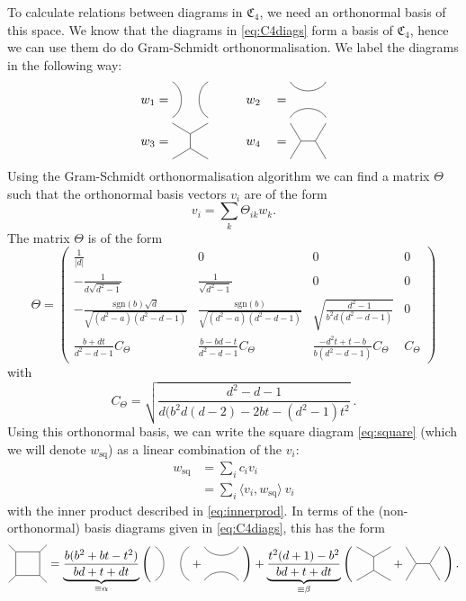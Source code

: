 To calculate relations between diagrams in $\mathfrak{C}_4$, we need an orthonormal basis of this space. We know that the diagrams in \cref{eq:C4diags} form a basis of $\mathfrak{C}_4$, hence we can use them do do Gram-Schmidt orthonormalisation. We label the diagrams in the following way:
	\begin{alignat}{2}
		w_1&=\Cfourone\hspace{30pt} w_2&&=\Cfourtwo\\
		w_3&=\Cfourthree\hspace{30pt} w_4&&=\Cfourfour
	\end{alignat}
Using the Gram-Schmidt orthonormalisation algorithm we can find a matrix $\Theta$ such that the orthonormal basis vectors $v_i$ are of the form
	\begin{equation}
		v_i=\sum_k\Theta_{ik} w_k.
	\end{equation}
The matrix $\Theta$ is of the form
	\begin{equation}
		\Theta=
		\begin{pmatrix}
		\frac{1}{|d|} & 0 & 0 & 0 \\
		-\frac{1}{d\sqrt{d^2-1}} & \frac{1}{\sqrt{d^2-1}} & 0 & 0 \\
		-\frac{\mathrm{sgn}(b) \sqrt{d}}{\sqrt{(d^2-a)(d^2-d-1)}} & \frac{\mathrm{sgn}(b)}{\sqrt{(d^2-a)(d^2-d-1)}} & \sqrt{\frac{d^2-1}{b^2d(d^2-d-1)}} & 0 \\
		\frac{b+dt}{d^2-d-1} C_\Theta & \frac{b-bd-t}{d^2-d-1} C_\Theta & \frac{-d^2t+t-b}{b(d^2-d-1)} C_\Theta & C_\Theta
		\end{pmatrix}
	\end{equation}
with
	\begin{equation}
		C_\Theta=\sqrt{\frac{d^2-d-1}{d(b^2d(d-2)-2bt-(d^2-1)t^2}}\ .
	\end{equation}
Using this orthonormal basis, we can write the square diagram \cref{eq:square} (which we will denote $w_\mathrm{sq}$) as a linear combination of the $v_i$:
	\begin{align}
		w_\mathrm{sq}&=\sum_i c_i v_i\\
		&= \sum_i \langle  v_i,w_{\mathrm{sq}} \rangle\ v_i
	\end{align}
with the inner product described in \cref{eq:innerprod}. In terms of the (non-orthonormal) basis diagrams given in \cref{eq:C4diags}, this has the form
	\begin{equation}
	\label{eq:squarelincom}
		\begin{tikzpicture}[scale=0.7,baseline={([yshift=-3pt]current bounding box.center)}]
		\draw (0,0) rectangle (1,1);
		\draw (0,0) -- (-0.3,-0.3);
		\draw (0,1) -- (-0.3,1.3);
		\draw (1,0) -- (1.3,-0.3);
		\draw (1,1) -- (1.3,1.3);
		\end{tikzpicture}=\underbrace{\frac{b(b^2+bt-t^2)}{bd+t+dt}}_{\equiv \alpha}\left(\ 
		\Cfourone+
		\Cfourtwo\ \right)
		+\underbrace{\frac{t^2(d+1)-b^2}{bd+t+dt}}_{\equiv\beta}\left(\ 
		\Cfourthree+
		\Cfourfour\ \right).
	\end{equation}
